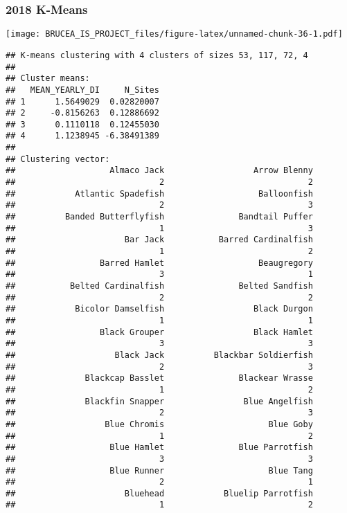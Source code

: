 \documentclass[
]{article}
\begin{document}
\hypertarget{k-means-10}{%
\subsubsection{2018 K-Means}\label{k-means-10}}

\texttt{[image: BRUCEA\_IS\_PROJECT\_files/figure-latex/unnamed-chunk-36-1.pdf]}

\begin{verbatim}
## K-means clustering with 4 clusters of sizes 53, 117, 72, 4
## 
## Cluster means:
##   MEAN_YEARLY_DI     N_Sites
## 1      1.5649029  0.02820007
## 2     -0.8156263  0.12886692
## 3      0.1110118  0.12455030
## 4      1.1238945 -6.38491389
## 
## Clustering vector:
##                   Almaco Jack                  Arrow Blenny 
##                             2                             2 
##            Atlantic Spadefish                   Balloonfish 
##                             2                             3 
##          Banded Butterflyfish               Bandtail Puffer 
##                             1                             3 
##                      Bar Jack           Barred Cardinalfish 
##                             1                             2 
##                 Barred Hamlet                   Beaugregory 
##                             3                             1 
##           Belted Cardinalfish               Belted Sandfish 
##                             2                             2 
##            Bicolor Damselfish                  Black Durgon 
##                             1                             1 
##                 Black Grouper                  Black Hamlet 
##                             3                             3 
##                    Black Jack          Blackbar Soldierfish 
##                             2                             3 
##              Blackcap Basslet               Blackear Wrasse 
##                             1                             2 
##              Blackfin Snapper                Blue Angelfish 
##                             2                             3 
##                  Blue Chromis                     Blue Goby 
##                             1                             2 
##                   Blue Hamlet               Blue Parrotfish 
##                             3                             3 
##                   Blue Runner                     Blue Tang 
##                             2                             1 
##                      Bluehead            Bluelip Parrotfish 
##                             1                             2 

\end{verbatim}
\end{document}

